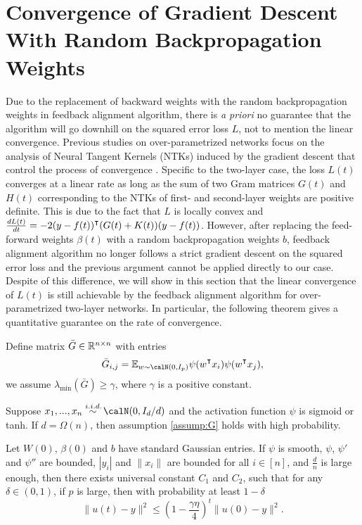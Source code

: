 \section{Convergence of Gradient Descent With Random Backpropagation Weights}

Due to the replacement of backward weights with the random backpropagation weights in feedback alignment algorithm, there is \emph{a priori} no guarantee that the algorithm will go downhill on the squared error loss $L$, not to mention the linear convergence.
Previous studies on over-parametrized networks focus on the analysis of Neural Tangent Kernels (NTKs) induced by the gradient descent that control the process of convergence \citep{du2018gradient,gao2020model}. Specific to the two-layer case, the loss $L(t)$ converges at a linear rate as long as the sum of two Gram matrices $G(t)$ and $H(t)$ corresponding to the NTKs of first- and second-layer weights are positive definite. This is due to the fact that $L$ is locally convex and $\frac{\diff L(t)}{\diff t} = -2 (y - f(t))\transpose(G(t) + K(t))(y - f(t))$. However, after replacing the feed-forward weights $\beta(t)$ with a random backpropagation weights $b$, feedback alignment algorithm no longer follows a strict gradient descent on the squared error loss and the previous argument cannot be applied directly to our case. Despite of this difference, we will show in this section that the linear convergence of $L(t)$ is still achievable by the feedback alignment algorithm for over-parametrized two-layer networks. In particular, the following theorem gives a quantitative guarantee on the rate of convergence.

\begin{assumption}\label{assump:G}
Define matrix $\bar{G} \in \mathbb{R}^{n\times n}$ with entries
\begin{equation*}
    \bar{G}_{i,j} = \E_{w\sim \calN(0,I_p)}\psi(w\transpose x_i) \psi(w\transpose  x_j),
\end{equation*}
we assume $\lambda_{\min}(\bar{G}) \geq \gamma$, where $\gamma$ is a positive constant.
\end{assumption}

\begin{proposition}\label{prop:positive-definiteness}
Suppose $x_1,...,x_n \overset{\iid}{\sim} \calN(0,I_d/d)$ and the activation function $\psi$ is sigmoid or tanh. If $d=\Omega(n)$, then assumption \ref{assump:G} holds with high probability.
\end{proposition}

\begin{theorem}[informal]
Let $W(0)$, $\beta(0)$ and $b$ have \iid standard Gaussian entries. If $\psi$ is smooth, $\psi$, $\psi'$ and $\psi''$ are bounded, $|y_i|$ and $\|x_i\|$ are bounded for all $i\in[n]$, and $\frac{d}{n}$ is large enough, then there exists universal constant $C_1$ and $C_2$, such that for any $\delta\in(0,1)$, if $p$ is large, then with probability at least $1-\delta$
\begin{equation*}
    \|u(t)-y\|^2 \leq (1-\frac{\gamma\eta}{4})^t\|u(0)-y\|^2.
\end{equation*}
\end{theorem}

